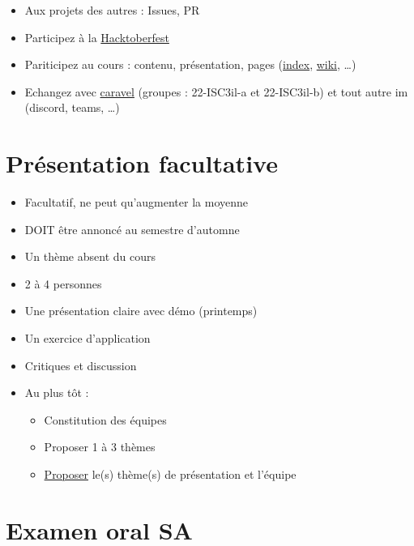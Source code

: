 \begin{itemize}
\tightlist
\item
  Aux projets des autres : Issues, PR
\item
  Participez à la
  \href{https://hacktoberfest.digitalocean.com/}{Hacktoberfest}
\item
  Pariticipez au cours : contenu, présentation, pages
  (\href{https://he-arc.github.io/}{index},
  \href{https://github.com/HE-Arc/slides-devweb/wiki}{wiki}, \ldots)
\item
  Echangez avec \href{https://caravel.ing.he-arc.ch/}{caravel} (groupes
  : 22-ISC3il-a et 22-ISC3il-b) et tout autre im (discord, teams,
  \ldots)
\end{itemize}

\hypertarget{pruxe9sentation-facultative}{%
\section{Présentation facultative}\label{pruxe9sentation-facultative}}

\begin{itemize}
\tightlist
\item
  Facultatif, ne peut qu'augmenter la moyenne
\item
  DOIT être annoncé au semestre d'automne
\item
  Un thème absent du cours
\item
  2 à 4 personnes
\item
  Une présentation claire avec démo (printemps)
\item
  Un exercice d'application
\item
  Critiques et discussion
\item
  Au plus tôt :

  \begin{itemize}
  \tightlist
  \item
    Constitution des équipes
  \item
    Proposer 1 à 3 thèmes
  \item
    \href{https://docs.google.com/spreadsheet/viewform?formkey=dEVJRE1WVTVPelhFcE94TGF5N1c0cGc6MQ}{Proposer}
    le(s) thème(s) de présentation et l'équipe
  \end{itemize}
\end{itemize}

\hypertarget{examen-oral-sa}{%
\section{Examen oral SA}\label{examen-oral-sa}}

